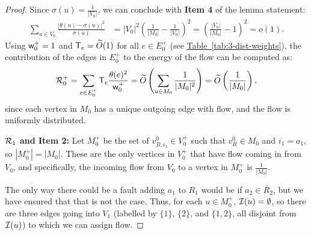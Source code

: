 \documentclass{article}
\newcommand{\tabl}[1]{\hyperref[tab:#1]{Table~\ref*{tab:#1}}}
\renewcommand{\>}{\rangle}
\newcommand{\<}{\langle}
\renewcommand{\(}{\left(}
\renewcommand{\)}{\right)}
\def\w{{\sf w}}
\begin{document}
\begin{proof}
Since $\sigma(u)=\frac{1}{|V_0|}$, we can conclude with \textbf{Item 4} of the lemma statement:
\begin{equation*}
\begin{split}
\sum_{u\in V_0}\frac{|\theta(u)-\sigma(u)|^2}{\sigma(u)} 
&= |V_0|^2\left(\frac{1}{|M_0|}-\frac{1}{|V_0|}\right)^2
= \left(\frac{|V_0|}{|M_0|}-1\right)^2=o(1).
\end{split}\label{eq:delta-bound}
\end{equation*}
Using $\w_0^+=1$ and ${\sf T}_e=\widetilde{O}(1)$ for all $e\in E_0^+$ (see \tabl{3-dist-weights}), the contribution of the edges in $E_0^+$ to the energy of the flow can be computed as:
\begin{equation}
{\cal R}_0^+ = \sum_{e\in E_0^+}{\sf T}_e\frac{\theta(e)^2}{\w_0^+} = \widetilde{O}\left(\sum_{u\in M_0}\frac{1}{|M_0|^2}\right)=\widetilde{O}\left(\frac{1}{|M_0|}\right),\label{eq:R1}
\end{equation}
since each vertex in $M_0$ has a unique outgoing edge with flow, and the flow is uniformly distributed.

\vskip7pt
\noindent\textbf{${\cal R}_1$ and Item 2:} Let $M_0^+$ be the set of $v^0_{R,i_1}\in V_0^+$ such that $v^0_{R}\in M_0$ and $i_1=a_1$, so $|M_0^+|=|M_0|$. These are the only vertices in $V_0^+$ that have flow coming in from $V_0$, and specifically, the incoming flow from $V_0$ to a vertex in $M_0^+$ is $\frac{1}{|M_0|}$. 


The only way there could be a fault adding $a_1$ to $R_1$ would be if $a_2\in \overline{R}_2$, but we have ensured that that is not the case. Thus, for each $u\in M_0^+$, ${\cal I}(u)=\emptyset$, so there are three edges going into $V_1$ (labelled by $\{1\}$, $\{2\}$, and $\{1,2\}$, all disjoint from ${\cal I}(u)$) to which we can assign flow. 


\end{proof}
\end{document}
